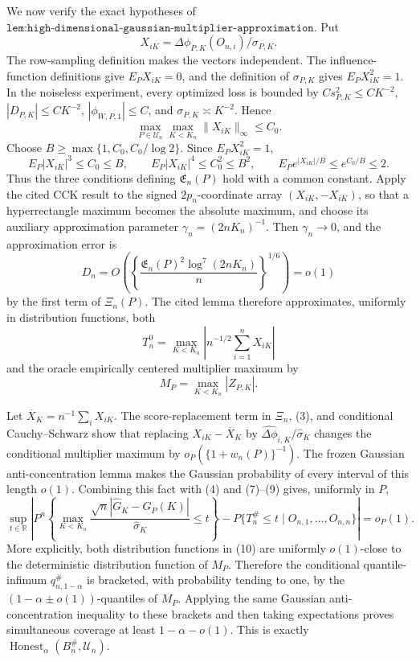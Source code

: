 We now verify the exact hypotheses of \(\texttt{lem:high-dimensional-gaussian-multiplier-approximation}\).  Put
\[
 X_{iK}=\Delta\phi_{P,K}(O_{n,i})/\sigma_{P,K}.
\]
The row-sampling definition makes the vectors independent.  The influence-function definitions give \(E_PX_{iK}=0\), and the definition of \(\sigma_{P,K}\) gives \(E_PX_{iK}^2=1\).  In the noiseless experiment, every optimized loss is bounded by \(Cs_{P,K}^2\leq CK^{-2}\), \(|D_{P,K}|\leq CK^{-2}\), \(|\phi_{W,P,1}|\leq C\), and \(\sigma_{P,K}\asymp K^{-2}\).  Hence
\[
 \max_{P\in\mathcal U_n}\max_{K<K_n}\|X_{iK}\|_\infty\leq C_0.           \tag{5}
\]
Choose \(B\geq\max\{1,C_0,C_0/\log2\}\).  Since \(E_PX_{iK}^2=1\),
\[
 E_P|X_{iK}|^3\leq C_0\leq B,\qquad
 E_P|X_{iK}|^4\leq C_0^2\leq B^2,
 \qquad E_Pe^{|X_{iK}|/B}\leq e^{C_0/B}\leq2.                              \tag{6}
\]
Thus the three conditions defining \(\mathfrak E_n(P)\) hold with a common constant.  Apply the cited CCK result to the signed \(2p_n\)-coordinate array \((X_{iK},-X_{iK})\), so that a hyperrectangle maximum becomes the absolute maximum, and choose its auxiliary approximation parameter \(\gamma_n=(2nK_n)^{-1}\).  Then \(\gamma_n\to0\), and the approximation error is
\[
 D_n=O\!\left(\left\{\frac{\mathfrak E_n(P)^2\log^7(2nK_n)}n\right\}^{1/6}\right)=o(1)              \tag{7}
\]
by the first term of \(\Xi_n(P)\).  The cited lemma therefore approximates, uniformly in distribution functions, both
\[
 T_n^0=\max_{K<K_n}\left|n^{-1/2}\sum_{i=1}^nX_{iK}\right|                 \tag{8}
\]
and the oracle empirically centered multiplier maximum by
\[
 M_P=\max_{K<K_n}|Z_{P,K}|.                                                  \tag{9}
\]

Let \(\overline X_K=n^{-1}\sum_iX_{iK}\).  The score-replacement term in \(\Xi_n\), (3), and conditional Cauchy--Schwarz show that replacing \(X_{iK}-\overline X_K\) by \(\widehat{\Delta\phi}_{i,K}/\widehat\sigma_K\) changes the conditional multiplier maximum by \(o_P(\{1+w_n(P)\}^{-1})\).  The frozen Gaussian anti-concentration lemma makes the Gaussian probability of every interval of this length \(o(1)\).  Combining this fact with (4) and (7)--(9) gives, uniformly in \(P\),
\[
 \sup_{t\in\mathbb R}\left|
 P^n\!\left\{\max_{K<K_n}\frac{\sqrt n|\widehat G_K-G_P(K)|}{\widehat\sigma_K}\leq t\right\}
 -P\{T_n^{\#}\leq t\mid O_{n,1},\ldots,O_{n,n}\}
 \right|=o_P(1).                                                             \tag{10}
\]
More explicitly, both distribution functions in (10) are uniformly \(o(1)\)-close to the deterministic distribution function of \(M_P\).  Therefore the conditional quantile-infimum \(q_{n,1-\alpha}^{\#}\) is bracketed, with probability tending to one, by the \((1-\alpha\pm o(1))\)-quantiles of \(M_P\).  Applying the same Gaussian anti-concentration inequality to these brackets and then taking expectations proves simultaneous coverage at least \(1-\alpha-o(1)\).  This is exactly \(\operatorname{Honest}_{\alpha}(B_n^{\#},\mathcal U_n)\).

